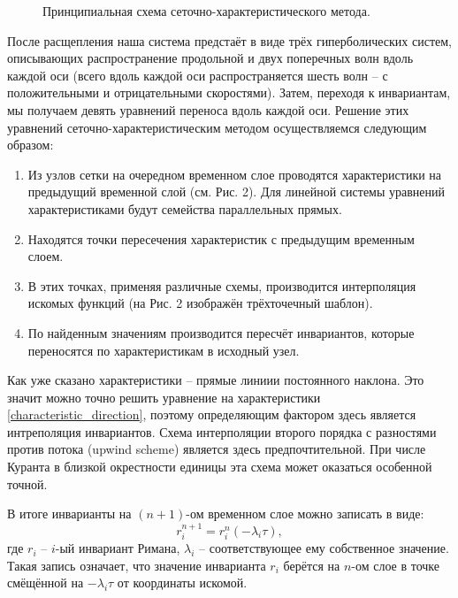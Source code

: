\begin{figure}[H]
	\caption{Принципиальная схема сеточно-характеристического метода.}
\end{figure}

	После расщепления наша система предстаёт в виде трёх гиперболических систем, описывающих распространение продольной и двух поперечных волн вдоль каждой оси (всего вдоль каждой оси распространяется шесть волн -- с положительными и отрицательными скоростями).
	Затем, переходя к инвариантам, мы получаем девять уравнений переноса вдоль каждой оси.
	Решение этих уравнений сеточно-характеристическим методом осуществляемся следующим образом:
\begin{enumerate}
	\item Из узлов сетки на очередном временном слое проводятся характеристики на предыдущий временной слой (см. Рис. 2). Для линейной системы уравнений характеристиками будут семейства параллельных прямых.
	\item Находятся точки пересечения характеристик с предыдущим временным слоем.
	\item В этих точках, применяя различные схемы, производится интерполяция искомых функций (на Рис. 2 изображён трёхточечный шаблон).
	\item По найденным значениям производится пересчёт инвариантов, которые переносятся по характеристикам в исходный узел.
\end{enumerate}
	
	Как уже сказано характеристики -- прямые линиии постоянного наклона. Это значит можно точно решить уравнение на характеристики \eqref{characteristic_direction}, поэтому определяющим фактором здесь является интреполяция инвариантов.
	Схема интерполяции второго порядка с разностями против потока (upwind scheme) является здесь предпочтительной.
	При числе Куранта в близкой окрестности единицы эта схема может оказаться особенной точной.
	
	В итоге инварианты на $(n+1)$-ом временном слое можно записать в виде:
\begin{equation}
	r_{i}^{n+1} = r_{i}^{n}(- \lambda_{i}\tau),
\end{equation}
	где $r_{i}$ -- $i$-ый инвариант Римана, $\lambda_{i}$ -- соответствующее ему собственное значение.
	Такая запись означает, что значение инварианта $r_{i}$ берётся на $n$-ом слое в точке смёщённой на $-\lambda_{i}\tau$ от координаты искомой.
	
